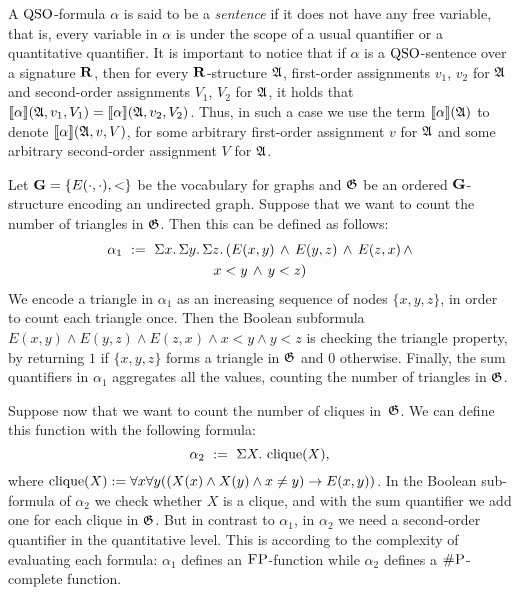 A ${\rm QSO}$-formula $\alpha$ is said to be a \emph{sentence} if it does not have any free variable, that is, every variable in $\alpha$ is under the scope of a usual quantifier or a quantitative quantifier. It is important to notice that if $\alpha$ is a ${\rm QSO}$-sentence over a signature $\mathbf{R}$, then for every $\mathbf{R}$-structure $\mathfrak{A}$, first-order assignments $v_1$, $v_2$ for $\mathfrak{A}$ and second-order assignments $V_1$, $V_2$ for $\mathfrak{A}$, it holds that ${\llbracket{}{\alpha}\rrbracket}(\mathfrak{A}, v_1, V_1) = {\llbracket{}{\alpha}\rrbracket}(\mathfrak{A}, v_2, V_2)$.
Thus, in such a case we use the term ${\llbracket{}{\alpha}\rrbracket}(\mathfrak{A})$ to denote ${\llbracket{}{\alpha}\rrbracket}(\mathfrak{A}, v, V)$, for some arbitrary first-order assignment $v$ for $\mathfrak{A}$ and some arbitrary second-order assignment $V$ for $\mathfrak{A}$. 
\begin{example}\label{ex:cliques}
Let $\mathbf{G} = \{E(\cdot,\cdot),<\}$ be the vocabulary for graphs and $\mathfrak{G}$ be an ordered $\mathbf{G}$-structure encoding an undirected graph. 
Suppose that we want to count the number of triangles in $\mathfrak{G}$. Then this can be defined as follows:
\begin{multline*}
\alpha_1 \ := \ \Sigma{x}.\, \Sigma{y}.\, \Sigma{z}.\, ( E(x,y) \, \wedge \, E(y,z) \, \wedge \, E(z,x) \, \wedge \\
x < y \, \wedge \, y < z )
\end{multline*}
We encode a triangle in $\alpha_1$ as an increasing sequence of nodes $\{x, y, z\}$, in order to count each triangle once. Then the Boolean subformula  $E(x,y) \wedge E(y,z) \wedge E(z,x) \wedge
x < y \wedge y < z$ is checking the triangle property, by returning $1$ if $\{x, y, z\}$ forms a triangle in $\mathfrak{G}$ and $0$ otherwise.
Finally, the sum quantifiers in $\alpha_1$ aggregates all the values, counting the number of triangles in $\mathfrak{G}$.

Suppose now that we want to count the number of cliques in~$\mathfrak{G}$.
We can 
define this function with the following formula:
$$
\alpha_2 \ := \ \Sigma{X}.\, \operatorname{clique}(X),
$$ 
where $\operatorname{clique}(X) := \forall x \forall y ((X(x) \wedge X(y) \wedge x \neq y)  \rightarrow E(x,y))$.
In the Boolean sub-formula of $\alpha_2$ we check whether $X$ is a clique, and with the sum quantifier we add one for each clique in $\mathfrak{G}$. 
But in contrast to $\alpha_1$, 
in $\alpha_2$ we need a second-order quantifier in the quantitative level.
This is according to the
complexity of evaluating each formula:
$\alpha_1$ defines an $\text{\sc FP}$-function while $\alpha_2$ defines a $\text{\sc \#P}$-complete function.
\end{example}

